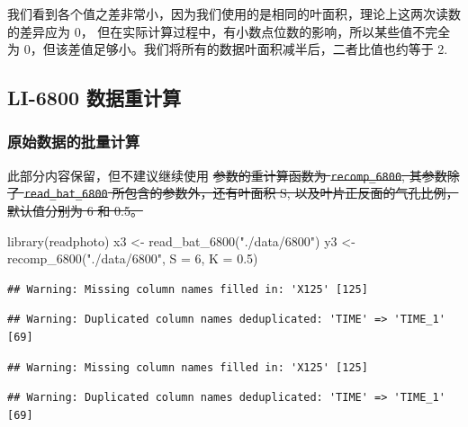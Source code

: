\documentclass[
]{krantz}
\makeatletter
\newenvironment{Shaded}{\begin{snugshade}}{\end{snugshade}}
\newcommand{\AttributeTok}[1]{\textcolor[rgb]{0.77,0.63,0.00}{#1}}
\newcommand{\DecValTok}[1]{\textcolor[rgb]{0.00,0.00,0.81}{#1}}
\newcommand{\FloatTok}[1]{\textcolor[rgb]{0.00,0.00,0.81}{#1}}
\newcommand{\FunctionTok}[1]{\textcolor[rgb]{0.00,0.00,0.00}{#1}}
\newcommand{\NormalTok}[1]{#1}
\newcommand{\OtherTok}[1]{\textcolor[rgb]{0.56,0.35,0.01}{#1}}
\newcommand{\StringTok}[1]{\textcolor[rgb]{0.31,0.60,0.02}{#1}}
\newenvironment{kframe}{%
\medskip{}
\setlength{\fboxsep}{.8em}
 \def\at@end@of@kframe{}%
 \ifinner\ifhmode%
  \def\at@end@of@kframe{\end{minipage}}%
  \begin{minipage}{\columnwidth}%
 \fi\fi%
 \def\FrameCommand##1{\hskip\@totalleftmargin \hskip-\fboxsep
 \colorbox{shadecolor}{##1}\hskip-\fboxsep
     \hskip-\linewidth \hskip-\@totalleftmargin \hskip\columnwidth}%
 \MakeFramed {\advance\hsize-\width
   \@totalleftmargin\z@ \linewidth\hsize
   \@setminipage}}%
 {\par\unskip\endMakeFramed%
 \at@end@of@kframe}
\renewenvironment{Shaded}{\begin{kframe}}{\end{kframe}}
\makeatother
\begin{document}
我们看到各个值之差非常小，因为我们使用的是相同的叶面积，理论上这两次读数的差异应为 0， 但在实际计算过程中，有小数点位数的影响，所以某些值不完全为 0，但该差值足够小。我们将所有的数据叶面积减半后，二者比值也约等于 2.

\hypertarget{recompute6800}{%
\subsection{LI-6800 数据重计算}\label{recompute6800}}

\hypertarget{raw-batch-68}{%
\subsubsection{原始数据的批量计算}\label{raw-batch-68}}

此部分内容保留，但不建议继续使用
\sout{参数的重计算函数为 \mbox{\texttt{recomp\_6800}}, 其参数除了 \mbox{\texttt{read\_bat\_6800}} 所包含的参数外，还有叶面积 S, 以及叶片正反面的气孔比例，默认值分别为 6 和 0.5。}

\begin{Shaded}
\begin{Highlighting}[]
\FunctionTok{library}\NormalTok{(readphoto)}
\NormalTok{x3 }\OtherTok{\textless{}{-}} \FunctionTok{read\_bat\_6800}\NormalTok{(}\StringTok{"./data/6800"}\NormalTok{)}
\NormalTok{y3 }\OtherTok{\textless{}{-}} \FunctionTok{recomp\_6800}\NormalTok{(}\StringTok{"./data/6800"}\NormalTok{, }\AttributeTok{S =} \DecValTok{6}\NormalTok{, }\AttributeTok{K =} \FloatTok{0.5}\NormalTok{)}
\end{Highlighting}
\end{Shaded}

\begin{verbatim}
## Warning: Missing column names filled in: 'X125' [125]
\end{verbatim}

\begin{verbatim}
## Warning: Duplicated column names deduplicated: 'TIME' => 'TIME_1' [69]
\end{verbatim}

\begin{verbatim}
## Warning: Missing column names filled in: 'X125' [125]
\end{verbatim}

\begin{verbatim}
## Warning: Duplicated column names deduplicated: 'TIME' => 'TIME_1' [69]
\end{verbatim}
\end{document}
